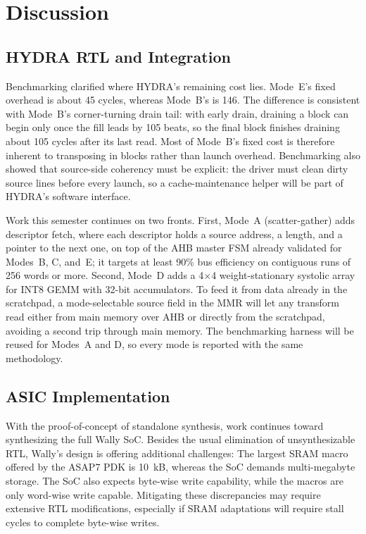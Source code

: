 \documentclass[conference]{IEEEtran}
\begin{document}
\section{Discussion}
    \subsection{HYDRA RTL and Integration}
        Benchmarking clarified where HYDRA's remaining cost lies. Mode~E's
        fixed overhead is about 45 cycles, whereas Mode~B's is 146. The
        difference is consistent with Mode~B's corner-turning drain tail:
        with early drain, draining a block can begin only once the fill
        leads by 105 beats, so the final block finishes draining about 105
        cycles after its last read. Most of Mode~B's fixed cost is
        therefore inherent to transposing in blocks rather than launch
        overhead. Benchmarking also showed that source-side coherency must
        be explicit: the driver must clean dirty source lines before every
        launch, so a cache-maintenance helper will be part of HYDRA's
        software interface.

        Work this semester continues on two fronts. First, Mode~A
        (scatter-gather) adds descriptor fetch, where each descriptor holds
        a source address, a length, and a pointer to the next one, on top
        of the AHB master FSM already validated for Modes~B, C, and~E; it
        targets at least 90\% bus efficiency on contiguous runs of 256 words
        or more. Second, Mode~D adds a 4$\times$4 weight-stationary systolic
        array~\cite{kung1982, jouppi2017} for INT8 GEMM with 32-bit
        accumulators. To feed it from data already in the scratchpad,
        a mode-selectable source field in the MMR will let any transform
        read either from main memory over AHB or directly from the
        scratchpad, avoiding a second trip through main memory. The benchmarking 
        harness will be reused for Modes~A and D, so every mode is reported with
        the same methodology.
    \subsection{ASIC Implementation}
        With the proof-of-concept of standalone synthesis, work continues toward synthesizing the full Wally SoC. Besides the usual elimination of unsynthesizable RTL, Wally's design is offering additional challenges: The largest SRAM macro offered by the ASAP7 PDK is \SI{10}{\kilo B}, whereas the SoC demands multi-megabyte storage. The SoC also expects byte-wise write capability, while the macros are only word-wise write capable. Mitigating these discrepancies may require extensive RTL modifications, especially if SRAM adaptations will require stall cycles to complete byte-wise writes.
\end{document}
